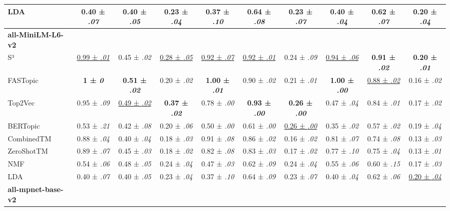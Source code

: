 \begin{table*}[p]
{\begin{tabular}{lccccccccc}
LDA & 0.40 ± \textit{.07} & 0.40 ± \textit{.05} & 0.23 ± \textit{.04} & 0.37 ± \textit{.10} & 0.64 ± \textit{.08} & 0.23 ± \textit{.07} & 0.40 ± \textit{.04} & 0.62 ± \textit{.07} & 0.20 ± \textit{.04}\\
\midrule
\textbf{all-MiniLM-L6-v2} & & & & & & & & &\\
\midrule
S³ & \underline{0.99 ± \textit{.01}} & 0.45 ± \textit{.02} & \underline{0.28 ± \textit{.05}} & \underline{0.92 ± \textit{.07}} & \underline{0.92 ± \textit{.01}} & 0.24 ± \textit{.09} & \underline{0.94 ± \textit{.06}} & \textbf{0.91 ± \textit{.02}} & \textbf{0.20 ± \textit{.01}}\\
FASTopic & \textbf{1 ± \textit{0}} & \textbf{0.51 ± \textit{.02}} & 0.20 ± \textit{.02} & \textbf{1.00 ± \textit{.01}} & 0.90 ± \textit{.02} & 0.21 ± \textit{.01} & \textbf{1.00 ± \textit{.00}} & \underline{0.88 ± \textit{.02}} & 0.16 ± \textit{.02}\\
Top2Vec & 0.95 ± \textit{.09} & \underline{0.49 ± \textit{.02}} & \textbf{0.37 ± \textit{.02}} & 0.78 ± \textit{.00} & \textbf{0.93 ± \textit{.00}} & \textbf{0.26 ± \textit{.00}} & 0.47 ± \textit{.04} & 0.84 ± \textit{.01} & 0.17 ± \textit{.02}\\
BERTopic & 0.53 ± \textit{.21} & 0.42 ± \textit{.08} & 0.20 ± \textit{.06} & 0.50 ± \textit{.00} & 0.61 ± \textit{.00} & \underline{0.26 ± \textit{.00}} & 0.35 ± \textit{.02} & 0.57 ± \textit{.02} & 0.19 ± \textit{.04}\\
CombinedTM & 0.88 ± \textit{.04} & 0.40 ± \textit{.04} & 0.18 ± \textit{.03} & 0.91 ± \textit{.08} & 0.86 ± \textit{.02} & 0.16 ± \textit{.02} & 0.81 ± \textit{.07} & 0.74 ± \textit{.08} & 0.13 ± \textit{.03}\\
ZeroShotTM & 0.89 ± \textit{.07} & 0.45 ± \textit{.03} & 0.18 ± \textit{.02} & 0.82 ± \textit{.08} & 0.83 ± \textit{.03} & 0.17 ± \textit{.02} & 0.77 ± \textit{.10} & 0.75 ± \textit{.04} & 0.13 ± \textit{.01}\\
NMF & 0.54 ± \textit{.06} & 0.48 ± \textit{.05} & 0.24 ± \textit{.04} & 0.47 ± \textit{.03} & 0.62 ± \textit{.09} & 0.24 ± \textit{.04} & 0.55 ± \textit{.06} & 0.60 ± \textit{.15} & 0.17 ± \textit{.03}\\
LDA & 0.40 ± \textit{.07} & 0.40 ± \textit{.05} & 0.23 ± \textit{.04} & 0.37 ± \textit{.10} & 0.64 ± \textit{.09} & 0.23 ± \textit{.07} & 0.40 ± \textit{.04} & 0.62 ± \textit{.06} & \underline{0.20 ± \textit{.04}}\\
\midrule
\textbf{all-mpnet-base-v2} & & & & & & & & &\\

\end{tabular}}
\end{table*}
